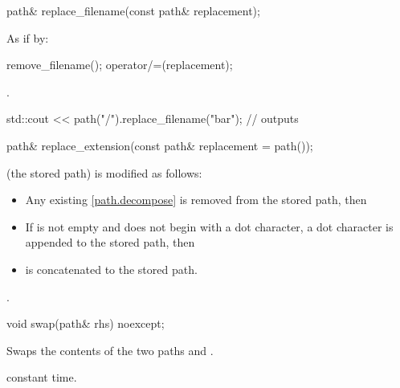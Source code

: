%
\begin{itemdecl}
path& replace_filename(const path& replacement);
\end{itemdecl}

\begin{itemdescr}
\pnum
\effects
As if by:
\begin{codeblock}
remove_filename();
operator/=(replacement);
\end{codeblock}

\pnum
\returns {}.

\pnum
\begin{example}
\begin{codeblock}
std::cout << path("/").replace_filename("bar");     // outputs 
\end{codeblock}
\end{example}
\end{itemdescr}

%
\begin{itemdecl}
path& replace_extension(const path& replacement = path());
\end{itemdecl}

\begin{itemdescr}
\pnum
\effects {} (the stored path) is modified as follows:
  \begin{itemize}
\item Any existing \ref{path.decompose}\tcode{)} is removed from the stored path,
    then
\item If  is not empty and does not begin with a dot
    character, a dot character is appended to the stored path, then
\item
   is concatenated to the stored path.
  \end{itemize}

\pnum
\returns {}.
\end{itemdescr}

%
\begin{itemdecl}
void swap(path& rhs) noexcept;
\end{itemdecl}

\begin{itemdescr}
\pnum
\effects Swaps the contents of the two paths  and
.

\pnum
\complexity constant time.
\end{itemdescr}


